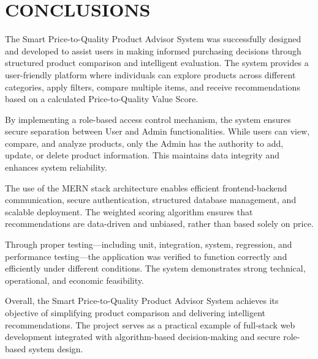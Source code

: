 \chapter{CONCLUSIONS}

The Smart Price-to-Quality Product Advisor System was successfully designed and developed to assist users in making informed purchasing decisions through structured product comparison and intelligent evaluation. The system provides a user-friendly platform where individuals can explore products across different categories, apply filters, compare multiple items, and receive recommendations based on a calculated Price-to-Quality Value Score.

By implementing a role-based access control mechanism, the system ensures secure separation between User and Admin functionalities. While users can view, compare, and analyze products, only the Admin has the authority to add, update, or delete product information. This maintains data integrity and enhances system reliability.

The use of the MERN stack architecture enables efficient frontend-backend communication, secure authentication, structured database management, and scalable deployment. The weighted scoring algorithm ensures that recommendations are data-driven and unbiased, rather than based solely on price.

Through proper testing—including unit, integration, system, regression, and performance testing—the application was verified to function correctly and efficiently under different conditions. The system demonstrates strong technical, operational, and economic feasibility.

Overall, the Smart Price-to-Quality Product Advisor System achieves its objective of simplifying product comparison and delivering intelligent recommendations. The project serves as a practical example of full-stack web development integrated with algorithm-based decision-making and secure role-based system design.

